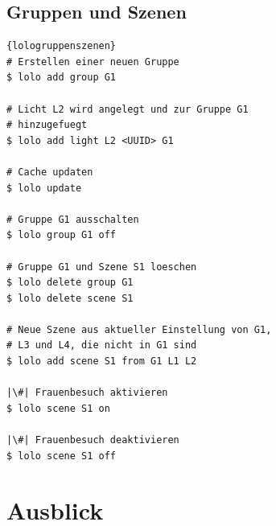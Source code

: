 \documentclass[a4paper,12pt]{article}
\begin{document}
\newpage

\subsection{Gruppen und Szenen}

\begin{lstlisting}[caption=Bedienung von Gruppen und Szenen,
                   basicstyle=\footnotesize\ttfamily]{lologruppenszenen}
# Erstellen einer neuen Gruppe
$ lolo add group G1

# Licht L2 wird angelegt und zur Gruppe G1
# hinzugefuegt
$ lolo add light L2 <UUID> G1

# Cache updaten
$ lolo update

# Gruppe G1 ausschalten
$ lolo group G1 off

# Gruppe G1 und Szene S1 loeschen
$ lolo delete group G1
$ lolo delete scene S1

# Neue Szene aus aktueller Einstellung von G1,
# L3 und L4, die nicht in G1 sind
$ lolo add scene S1 from G1 L1 L2

|\#| Frauenbesuch aktivieren
$ lolo scene S1 on

|\#| Frauenbesuch deaktivieren
$ lolo scene S1 off

\end{lstlisting}

\newpage

\section{Ausblick}

\newpage

\printglossary[type=\acronymtype,title=Abkürzungsverzeichnis]

\newpage

\printglossary
\end{document}
